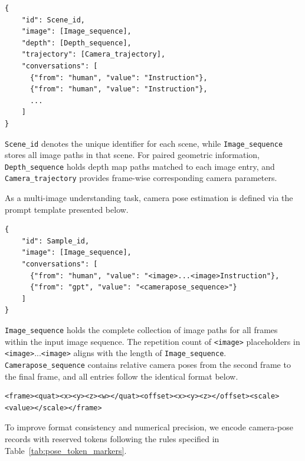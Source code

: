 \begin{lstlisting}[float=htb]
{
    "id": Scene_id,
    "image": [Image_sequence],
    "depth": [Depth_sequence],
    "trajectory": [Camera_trajectory],
    "conversations": [
      {"from": "human", "value": "Instruction"},
      {"from": "human", "value": "Instruction"},
      ...
    ]
}
\end{lstlisting}

\texttt{Scene\_id} denotes the unique identifier for each scene, while \texttt{Image\_sequence} stores all image paths in that scene.
For paired geometric information, \texttt{Depth\_sequence} holds depth map paths matched to each image entry, and \texttt{Camera\_trajectory} provides frame-wise corresponding camera parameters.

As a multi-image understanding task, camera pose estimation is defined via the prompt template presented below.

\begin{lstlisting}
{
    "id": Sample_id,
    "image": [Image_sequence],
    "conversations": [
      {"from": "human", "value": "<image>...<image>Instruction"},
      {"from": "gpt", "value": "<camerapose_sequence>"}
    ]
}
\end{lstlisting}

 \texttt{Image\_sequence} holds the complete collection of image paths for all frames within the input image sequence.
The repetition count of \texttt{<image>} placeholders in \texttt{<image>}...\texttt{<image>} aligns with the length of \texttt{Image\_sequence}. \texttt{Camerapose\_sequence} contains relative camera poses from the second frame to the final frame, and all entries follow the identical format below.
\begin{lstlisting}
<frame><quat><x><y><z><w></quat><offset><x><y><z></offset><scale><value></scale></frame>
\end{lstlisting}
To improve format consistency and numerical precision, we encode camera-pose records with reserved tokens following the rules specified in Table~\ref{tab:pose_token_markers}.

